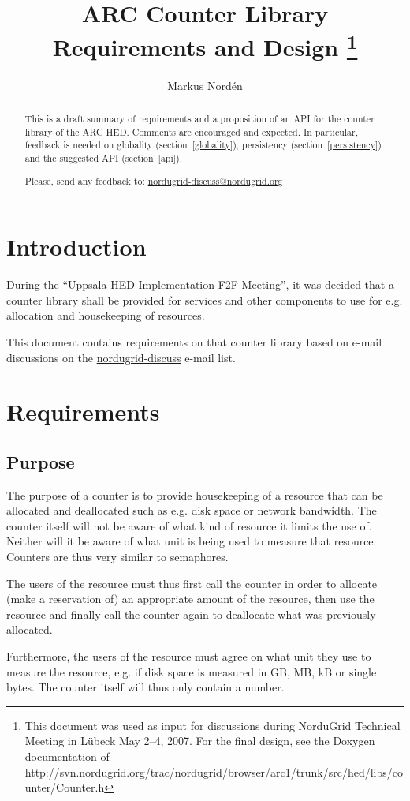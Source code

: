 \documentclass[a4paper,11pt]{article}
\title{ARC Counter Library\\
Requirements and Design
\footnote{This document was used as input for discussions during
NorduGrid Technical Meeting in L\"ubeck May 2--4, 2007. For the final
design, see the Doxygen documentation of http://svn.nordugrid.org/trac/nordugrid/browser/arc1/trunk/src/hed/libs/counter/Counter.h}}
\author{Markus Nord\'en}
\begin{document}
\maketitle


\begin{abstract}
  This is a draft summary of requirements and a proposition of an API
  for the counter library of the ARC HED. Comments are encouraged and
  expected. In particular, feedback is needed on globality
  (section~\ref{globality}), persistency (section~\ref{persistency})
  and the suggested API (section~\ref{api}).

  Please, send any feedback to: \url{nordugrid-discuss@nordugrid.org}
\end{abstract}


\section{Introduction}

During the ``Uppsala HED Implementation F2F Meeting'', it was decided
that a counter library shall be provided for services and other
components to use for e.g. allocation and housekeeping of resources.

This document contains requirements on that counter library based on
e-mail discussions on the \url{nordugrid-discuss} e-mail list.


\section{Requirements}

\subsection{Purpose}

The purpose of a counter is to provide housekeeping of a resource that
can be allocated and deallocated such as e.g. disk space or network
bandwidth. The counter itself will not be aware of what kind of
resource it limits the use of. Neither will it be aware of what unit
is being used to measure that resource. Counters are thus very similar
to semaphores.

The users of the resource must thus first call the counter in order to
allocate (make a reservation of) an appropriate amount of the
resource, then use the resource and finally call the counter again to
deallocate what was previously allocated.

Furthermore, the users of the resource must agree on what unit they
use to measure the resource, e.g. if disk space is measured in GB, MB,
kB or single bytes. The counter itself will thus only contain a number.
\end{document}
